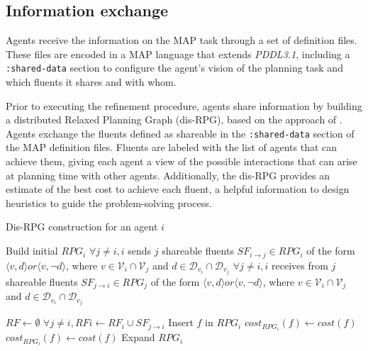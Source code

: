 \documentclass[12pt]{article}
\begin{document}
\subsection{Information exchange}

Agents receive the information on the MAP task through a set of definition files.
These files are encoded in a MAP language that extends \textit{PDDL3.1}, including a \texttt{:shared-data} section to configure the agent’s vision of the planning task and which fluents it shares and with whom.

Prior to executing the refinement procedure, agents share information by building a distributed Relaxed Planning Graph (dis-RPG), based on the approach of \cite{Zhang2007GraphbasedMR}.
Agents exchange the fluents defined as shareable in the \texttt{:shared-data} section of the MAP definition files.
Fluents are labeled with the list of agents that can achieve them, giving each agent a view of the possible interactions that can arise at planning time with other agents.
Additionally, the dis-RPG provides an estimate of the best cost to achieve each fluent, a helpful information to design heuristics to guide the problem-solving process.

\begin{algorithm}
\caption{Dis-RPG construction for an agent $i$}
\label{alg:1}
  \begin{algorithmic}
  \State Build initial $RPG_i$
  \Repeat
    \State $\forall j \neq i, i$ sends $j$ shareable fluents $SF_{i\rightarrow j} \in RPG_i$ of the form $\langle v,d\rangle or \langle v,\neg d\rangle$, where $v \in \mathcal{V}_i \cap \mathcal{V}_j$ and $d \in \mathcal{D}_{v_i} \cap \mathcal{D}_{v_j}$
    \State $\forall j \neq i, i$ receives from $j$ shareable fluents $SF_{j\rightarrow i} \in RPG_j$ of the form $\langle v,d\rangle or \langle v,\neg d\rangle$, where $v \in \mathcal{V}_i \cap \mathcal{V}_j$ and $d \in \mathcal{D}_{v_i} \cap \mathcal{D}_{v_j}$

      \State $RF \leftarrow \emptyset$
      $\forall j \neq i, RFi \leftarrow RF_i \cup SF_{j\rightarrow i}$
          \State Insert $f$ in $RPG_i$
          \State $cost_{RPG_i}(f) \leftarrow cost(f)$
        \EndIf
          \State $cost_{RPG_i}(f) \leftarrow cost(f)$
        \EndIf
      \EndFor
      \State Expand $RPG_i$
  \end{algorithmic}
\end{algorithm}
\end{document}
